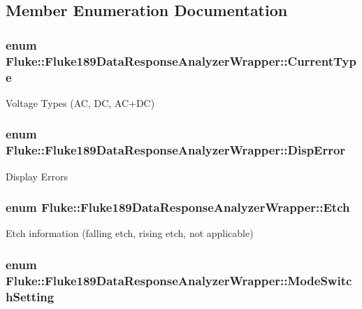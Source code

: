 \subsection{Member Enumeration Documentation}
\hypertarget{classFluke_1_1Fluke189DataResponseAnalyzerWrapper_afef24496da239e3613c40ad3582d7adc}{
\subsubsection[{CurrentType}]{\setlength{\rightskip}{0pt plus 5cm}enum {\bf Fluke::Fluke189DataResponseAnalyzerWrapper::CurrentType}}}
\label{classFluke_1_1Fluke189DataResponseAnalyzerWrapper_afef24496da239e3613c40ad3582d7adc}
Voltage Types (AC, DC, AC+DC) \hypertarget{classFluke_1_1Fluke189DataResponseAnalyzerWrapper_a5e26140c615bf0b73788f665a7bec9c7}{
\subsubsection[{DispError}]{\setlength{\rightskip}{0pt plus 5cm}enum {\bf Fluke::Fluke189DataResponseAnalyzerWrapper::DispError}}}
\label{classFluke_1_1Fluke189DataResponseAnalyzerWrapper_a5e26140c615bf0b73788f665a7bec9c7}
Display Errors \hypertarget{classFluke_1_1Fluke189DataResponseAnalyzerWrapper_ada71f6ab32a7b0eb40bb0ed96d7053bc}{
\subsubsection[{Etch}]{\setlength{\rightskip}{0pt plus 5cm}enum {\bf Fluke::Fluke189DataResponseAnalyzerWrapper::Etch}}}
\label{classFluke_1_1Fluke189DataResponseAnalyzerWrapper_ada71f6ab32a7b0eb40bb0ed96d7053bc}
Etch information (falling etch, rising etch, not applicable) \hypertarget{classFluke_1_1Fluke189DataResponseAnalyzerWrapper_a2ec2700a6086ae0ebd9601fe0c0f957a}{
\subsubsection[{ModeSwitchSetting}]{\setlength{\rightskip}{0pt plus 5cm}enum {\bf Fluke::Fluke189DataResponseAnalyzerWrapper::ModeSwitchSetting}}}
